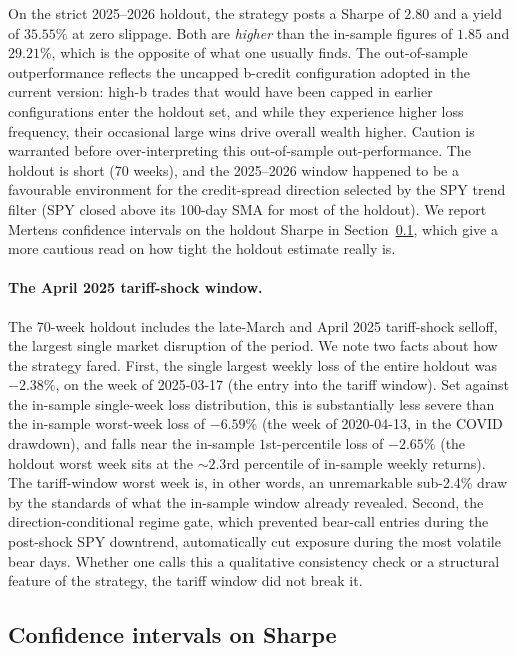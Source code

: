 \documentclass[11pt]{article}
\theoremstyle{definition}
\theoremstyle{remark}
\begin{document}
On the strict 2025--2026 holdout, the strategy posts a Sharpe of
$2.80$ and a yield of $35.55\%$ at zero slippage. Both are
\emph{higher} than the in-sample figures of $1.85$ and $29.21\%$,
which is the opposite of what one usually finds. The out-of-sample outperformance reflects the uncapped b-credit configuration adopted in the current version: high-b trades that would have been capped in earlier configurations enter the holdout set, and while they experience higher loss frequency, their occasional large wins drive overall wealth higher. Caution is warranted
before over-interpreting this out-of-sample out-performance. The holdout is short (70 weeks), and the
2025--2026 window happened to be a favourable environment for the
credit-spread direction selected by the SPY trend filter (SPY
closed above its 100-day SMA for most of the holdout). We report
Mertens confidence intervals on the holdout Sharpe in
Section~\ref{sec:sharpe-ci}, which give a more cautious read on
how tight the holdout estimate really is.

\paragraph{The April 2025 tariff-shock window.}
The 70-week holdout includes the late-March and April 2025
tariff-shock selloff, the largest single market disruption of the
period. We note two facts about how the strategy fared. First, the
single largest weekly loss of the entire holdout was $-2.38\%$, on
the week of 2025-03-17 (the entry into the tariff window). Set
against the in-sample single-week loss distribution, this is substantially
less severe than the in-sample worst-week loss of $-6.59\%$ (the week of
2020-04-13, in the COVID drawdown), and falls near the in-sample
$1$st-percentile loss of $-2.65\%$ (the holdout worst week sits at
the $\sim 2.3$rd percentile of in-sample weekly returns). The
tariff-window worst week is, in other words, an unremarkable
sub-2.4\% draw by the standards of what the in-sample window
already revealed. Second, the direction-conditional regime gate,
which prevented bear-call entries during the post-shock SPY
downtrend, automatically cut exposure during the most volatile
bear days. Whether one calls this a qualitative consistency check
or a structural feature of the strategy, the tariff window did
not break it.

\subsection{Confidence intervals on Sharpe}\label{sec:sharpe-ci}
\end{document}

